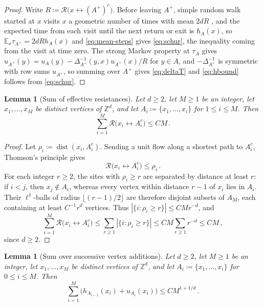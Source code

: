 \documentclass[11pt]{amsart}
\theoremstyle{plain}
\newtheorem{lemma}[theorem]{Lemma}
\theoremstyle{definition}
\newcommand{\Z}{\mathbb Z}
\newcommand{\E}{\mathbb E}
\newcommand{\dist}{\operatorname{dist}}
\newcommand{\Reff}{\mathcal R}
\begin{document}
	\begin{proof}
		Write $R\coloneqq\Reff\bigl(x\leftrightarrow(A^+)^c\bigr)$.  Before leaving
		$A^+$, simple random walk started at $x$ visits $x$ a geometric number
		of times with mean $2dR$
		\citep[Equation~(2.5)]{LyonsPeres2016}, and the expected time from
		each visit until the next return or exit is $h_A(x)$, so
		$\E_x\tau_{A^+}=2dRh_A(x)$ and \eqref{eq:mean-steps} gives
		\eqref{eq:schur}, the inequality coming from the visit at time zero.
		The strong Markov property at $\tau_A$ gives
		$u_{A^+}(y)=u_A(y)-\Delta_{A^+}^{-1}(y,x)u_{A^+}(x)/R$ for $y\in A$, and
		$-\Delta_{A^+}^{-1}$ is symmetric with row sums $u_{A^+}$, so summing over
		$A^+$ gives \eqref{eq:deltaT} and \eqref{eq:hbound} follows from
		\eqref{eq:schur}.
	\end{proof}

	\begin{lemma}[Sum of effective resistances]\label{lem:packing}
		Let $d\geq2$, let $M\geq1$ be an integer, let $x_1,\ldots,x_M$ be distinct
		vertices of $\Z^d$, and let $A_i\coloneqq\{x_1,\ldots,x_i\}$ for
		$1\leq i\leq M$.  Then
		\[
			\sum_{i=1}^M\Reff\bigl(x_i\leftrightarrow A_i^c\bigr)\leq CM\, .
		\]
	\end{lemma}

	\begin{proof}
		Let $\rho_i\coloneqq\dist(x_i,A_i^c)$.  Sending a unit flow along a shortest
		path to $A_i^c$, Thomson's principle
		\citep[Section~1.3.5]{DoyleSnell1984} gives
		\begin{equation}\label{eq:thomson}
			\Reff\bigl(x_i\leftrightarrow A_i^c\bigr)\leq\rho_i\, .
		\end{equation}
		For each integer $r\geq2$, the sites with $\rho_i\geq r$ are separated
		by distance at least $r$: if $i<j$, then $x_j\notin A_i$, whereas every
		vertex within distance $r-1$ of $x_i$ lies in $A_i$.
		Their $\ell^1$-balls of radius $\lfloor(r-1)/2\rfloor$ are therefore
		disjoint subsets of $A_M$, each containing at least $C^{-1}r^d$ vertices.
		Thus $|\{i:\rho_i\geq r\}|\leq CMr^{-d}$, and
		\[
		\sum_{i=1}^M\Reff\bigl(x_i\leftrightarrow A_i^c\bigr)
		\leq\sum_{r\geq1}|\{i:\rho_i\geq r\}|
		\leq CM\sum_{r\geq1}r^{-d}\leq CM\, ,
		\]
		since $d\geq2$.
	\end{proof}

	\begin{lemma}[Sum over successive vertex additions]\label{lem:insertion}
		Let $d\geq2$, let $M\geq1$ be an integer, let $x_1,\ldots,x_M$ be distinct
		vertices of $\Z^d$, and let $A_i\coloneqq\{x_1,\ldots,x_i\}$ for
		$0\leq i\leq M$.  Then
		\begin{equation}\label{eq:insertion-sum}
			\sum_{i=1}^M\bigl(h_{A_{i-1}}(x_i)+u_{A_i}(x_i)\bigr)
			\leq CM^{1+1/d}\, .
		\end{equation}
	\end{lemma}
\end{document}
